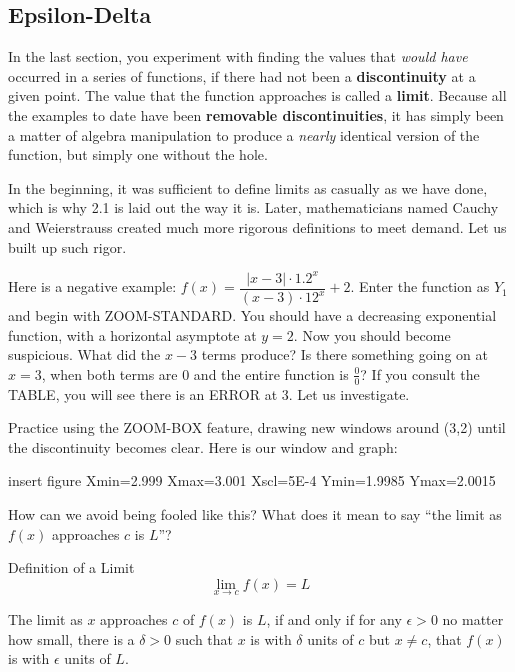 
\subsection{Epsilon-Delta}



In the last section, you experiment with finding the values that \emph{would have}
occurred in a series of functions, if there had not been a \textbf{discontinuity} at a given
point.  The value that the function approaches is called a \textbf{limit}.  Because all the
examples to date have been \textbf{removable discontinuities}, it has simply been a matter
of algebra manipulation to produce a \emph{nearly} identical version of the function, but
simply one without the hole.

In the beginning, it was sufficient to define limits as casually as we have done, which is why
2.1 is laid out the way it is.  Later, mathematicians named Cauchy and Weierstrauss created
much more rigorous definitions to meet demand.  Let us built up such rigor.

Here is a negative example: $f(x)=\dfrac{|x-3|\cdot1.2^x}{(x-3)\cdot12^x}+2$.  Enter the 
function as $Y_1$ and begin with ZOOM-STANDARD.  You should have a decreasing
exponential function, with a horizontal asymptote at $y=2$.  Now you should become
suspicious.  What did the $x-3$ terms produce?  Is there something going on at $x=3$,
when both terms are 0 and the entire function is $\frac{0}{0}$?  If you consult the
TABLE, you will see there is an ERROR at 3.  Let us investigate.

Practice using the ZOOM-BOX feature, drawing new windows around (3,2) until the 
discontinuity becomes clear.  Here is our window and graph:

insert figure Xmin=2.999 Xmax=3.001 Xscl=5E-4 Ymin=1.9985 Ymax=2.0015 


How can we avoid being fooled like this?  What does it mean to say ``the limit as
$f(x)$ approaches $c$ is $L$''?




\begin{derivation}{Definition of a Limit}
$$\lim_{x\rightarrow c} f(x)=L$$


The limit as $x$ approaches $c$ of $f(x)$ is $L$, if and only if
for any $\epsilon>0$ no matter how small, there is a $\delta>0$ such that
$x$ is with $\delta$ units of $c$ but $x\ne c$, that $f(x)$ is with $\epsilon$ units of $L$.
\end{derivation}




